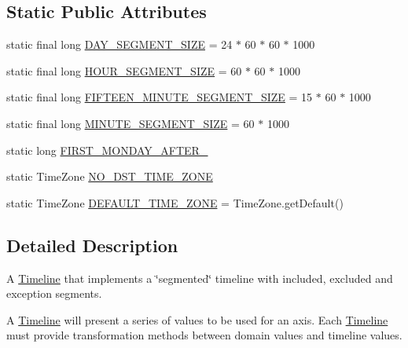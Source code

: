 \subsection*{Static Public Attributes}
\begin{DoxyCompactItemize}
\item 
static final long \mbox{\hyperlink{classorg_1_1jfree_1_1chart_1_1axis_1_1_segmented_timeline_a6ac56fcd3db1c4c7470a7278eb8e80e3}{D\+A\+Y\+\_\+\+S\+E\+G\+M\+E\+N\+T\+\_\+\+S\+I\+ZE}} = 24 $\ast$ 60 $\ast$ 60 $\ast$ 1000
\item 
static final long \mbox{\hyperlink{classorg_1_1jfree_1_1chart_1_1axis_1_1_segmented_timeline_a4949442729c5c7796ab88ebe12102811}{H\+O\+U\+R\+\_\+\+S\+E\+G\+M\+E\+N\+T\+\_\+\+S\+I\+ZE}} = 60 $\ast$ 60 $\ast$ 1000
\item 
static final long \mbox{\hyperlink{classorg_1_1jfree_1_1chart_1_1axis_1_1_segmented_timeline_a06035a3a9b654bffc35128fc33f055d5}{F\+I\+F\+T\+E\+E\+N\+\_\+\+M\+I\+N\+U\+T\+E\+\_\+\+S\+E\+G\+M\+E\+N\+T\+\_\+\+S\+I\+ZE}} = 15 $\ast$ 60 $\ast$ 1000
\item 
static final long \mbox{\hyperlink{classorg_1_1jfree_1_1chart_1_1axis_1_1_segmented_timeline_aaddff48403f0d5409690c77b072b4899}{M\+I\+N\+U\+T\+E\+\_\+\+S\+E\+G\+M\+E\+N\+T\+\_\+\+S\+I\+ZE}} = 60 $\ast$ 1000
\item 
static long \mbox{\hyperlink{classorg_1_1jfree_1_1chart_1_1axis_1_1_segmented_timeline_af4db0b82a6c603d61e81a4d165a4c3c5}{F\+I\+R\+S\+T\+\_\+\+M\+O\+N\+D\+A\+Y\+\_\+\+A\+F\+T\+E\+R\+\_}}
\item 
static Time\+Zone \mbox{\hyperlink{classorg_1_1jfree_1_1chart_1_1axis_1_1_segmented_timeline_a0b01d8fab7fc935076855dd8a4cf2ab8}{N\+O\+\_\+\+D\+S\+T\+\_\+\+T\+I\+M\+E\+\_\+\+Z\+O\+NE}}
\item 
static Time\+Zone \mbox{\hyperlink{classorg_1_1jfree_1_1chart_1_1axis_1_1_segmented_timeline_ad88a586988ebef85e1d0e846b271036f}{D\+E\+F\+A\+U\+L\+T\+\_\+\+T\+I\+M\+E\+\_\+\+Z\+O\+NE}} = Time\+Zone.\+get\+Default()
\end{DoxyCompactItemize}


\subsection{Detailed Description}
A \mbox{\hyperlink{interfaceorg_1_1jfree_1_1chart_1_1axis_1_1_timeline}{Timeline}} that implements a \char`\"{}segmented\char`\"{} timeline with included, excluded and exception segments. 

A \mbox{\hyperlink{interfaceorg_1_1jfree_1_1chart_1_1axis_1_1_timeline}{Timeline}} will present a series of values to be used for an axis. Each \mbox{\hyperlink{interfaceorg_1_1jfree_1_1chart_1_1axis_1_1_timeline}{Timeline}} must provide transformation methods between domain values and timeline values.

